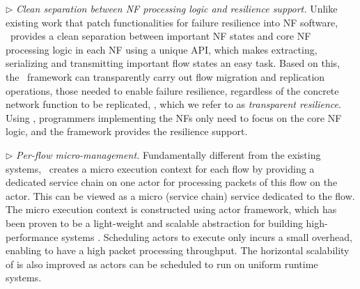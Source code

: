 $\triangleright$ {\em Clean separation between NF processing logic and resilience support.} Unlike existing work
\cite{gember2015opennf, sherry2015rollback} that patch functionalities for failure resilience into NF software, \nfactor~provides a clean separation between important NF states and core NF processing logic in each NF using a unique API, which makes extracting, serializing and transmitting important flow states an easy task.
Based on this, the \nfactor~framework can transparently carry out flow migration and replication operations, those needed to enable failure resilience, regardless of the concrete network function to be replicated, \ie, which we refer to as {\em transparent resilience}. Using \nfactor, programmers implementing the NFs only need to focus on the core NF logic, and the framework provides the resilience support. %


$\triangleright$ {\em Per-flow micro-management.} Fundamentally different from the existing systems, \nfactor~creates a micro execution context for each flow by providing a dedicated service chain on one actor for processing packets of this flow on the actor. This can be viewed as a micro (service chain) service dedicated to the flow.
The micro execution context is constructed using actor framework, which has been proven to be a light-weight and scalable abstraction for building high-performance systems \cite{newell2016optimizing}. Scheduling actors to execute only incurs a small overhead, enabling \nfactor to have a high packet processing throughput. The horizontal scalability of \nfactor is also improved as actors can be scheduled to run on uniform runtime systems.



